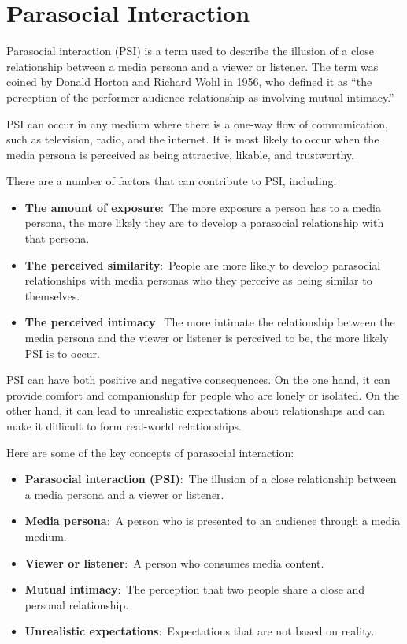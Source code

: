 \documentclass[
  b5paper]{book}
\begin{document}
\hypertarget{parasocial-interaction}{%
\section{Parasocial Interaction}\label{parasocial-interaction}}

Parasocial interaction (PSI) is a term used to describe the illusion of a close relationship between a media persona and a viewer or listener. The term was coined by Donald Horton and Richard Wohl in 1956, who defined it as ``the perception of the performer-audience relationship as involving mutual intimacy.''

PSI can occur in any medium where there is a one-way flow of communication, such as television, radio, and the internet. It is most likely to occur when the media persona is perceived as being attractive, likable, and trustworthy.

There are a number of factors that can contribute to PSI, including:

\begin{itemize}
\item
  \textbf{The amount of exposure}:~The more exposure a person has to a media persona, the more likely they are to develop a parasocial relationship with that persona.
\item
  \textbf{The perceived similarity}:~People are more likely to develop parasocial relationships with media personas who they perceive as being similar to themselves.
\item
  \textbf{The perceived intimacy}:~The more intimate the relationship between the media persona and the viewer or listener is perceived to be, the more likely PSI is to occur.
\end{itemize}

PSI can have both positive and negative consequences. On the one hand, it can provide comfort and companionship for people who are lonely or isolated. On the other hand, it can lead to unrealistic expectations about relationships and can make it difficult to form real-world relationships.

Here are some of the key concepts of parasocial interaction:

\begin{itemize}
\item
  \textbf{Parasocial interaction (PSI)}:~The illusion of a close relationship between a media persona and a viewer or listener.
\item
  \textbf{Media persona}:~A person who is presented to an audience through a media medium.
\item
  \textbf{Viewer or listener}:~A person who consumes media content.
\item
  \textbf{Mutual intimacy}:~The perception that two people share a close and personal relationship.
\item
  \textbf{Unrealistic expectations}:~Expectations that are not based on reality.
\end{itemize}
\end{document}

